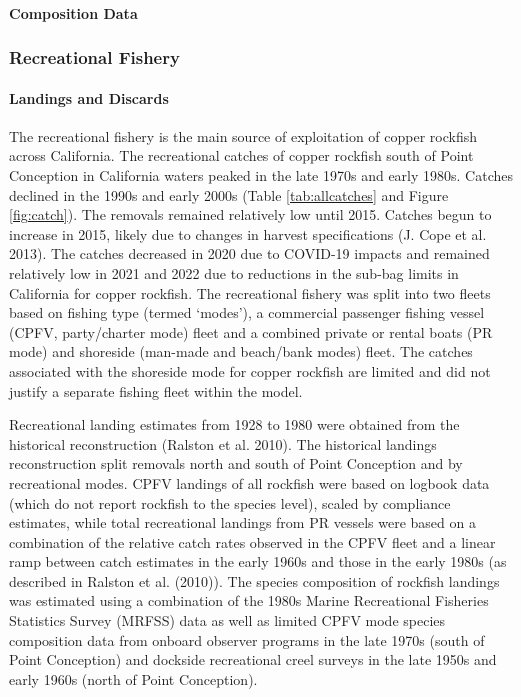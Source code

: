 \documentclass[11pt,
  english,
  letterpaper,
]{article}
\begin{document}
\hypertarget{composition-data}{%
\paragraph{Composition Data}\label{composition-data}}

\hypertarget{recreational-fishery}{%
\subsubsection{Recreational Fishery}\label{recreational-fishery}}

\hypertarget{landings-and-discards-1}{%
\paragraph{Landings and Discards}\label{landings-and-discards-1}}

\hfill\break

The recreational fishery is the main source of exploitation of copper rockfish across California. The recreational catches of copper rockfish south of Point Conception in California waters peaked in the late 1970s and early 1980s. Catches declined in the 1990s and early 2000s (Table \ref{tab:allcatches} and Figure \ref{fig:catch}). The removals remained relatively low until 2015. Catches begun to increase in 2015, likely due to changes in harvest specifications (J. Cope et al. 2013). The catches decreased in 2020 due to COVID-19 impacts and remained relatively low in 2021 and 2022 due to reductions in the sub-bag limits in California for copper rockfish. The recreational fishery was split into two fleets based on fishing type (termed `modes'), a commercial passenger fishing vessel (CPFV, party/charter mode) fleet and a combined private or rental boats (PR mode) and shoreside (man-made and beach/bank modes) fleet. The catches associated with the shoreside mode for copper rockfish are limited and did not justify a separate fishing fleet within the model.

Recreational landing estimates from 1928 to 1980 were obtained from the historical reconstruction (Ralston et al. 2010). The historical landings reconstruction split removals north and south of Point Conception and by recreational modes. CPFV landings of all rockfish were based on logbook data (which do not report rockfish to the species level), scaled by compliance estimates, while total recreational landings from PR vessels were based on a combination of the relative catch rates observed in the CPFV fleet and a linear ramp between catch estimates in the early 1960s and those in the early 1980s (as described in Ralston et al. (2010)). The species composition of rockfish landings was estimated using a combination of the 1980s Marine Recreational Fisheries Statistics Survey (MRFSS) data as well as limited CPFV mode species composition data from onboard observer programs in the late 1970s (south of Point Conception) and dockside recreational creel surveys in the late 1950s and early 1960s (north of Point Conception).
\end{document}
